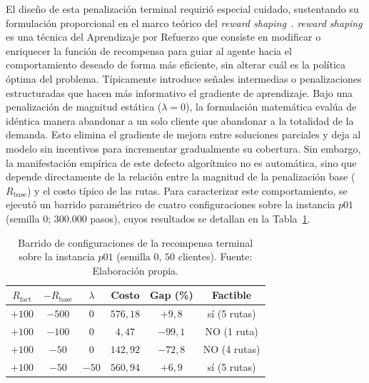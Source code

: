 
El diseño de esta penalización terminal requirió especial cuidado, sustentando su formulación proporcional en el marco teórico del \textit{reward shaping}~\cite{NgHaradaRussell1999}. \textit{reward shaping} es una técnica del Aprendizaje por Refuerzo que consiste en modificar o enriquecer la función de recompensa para guiar al agente hacia el comportamiento deseado de forma más eficiente, sin alterar cuál es la política óptima del problema. Típicamente introduce señales intermedias o penalizaciones estructuradas que hacen más informativo el gradiente de aprendizaje. Bajo una penalización de magnitud estática ($\lambda = 0$), la formulación matemática evalúa de idéntica manera abandonar a un solo cliente que abandonar a la totalidad de la demanda. Esto elimina el gradiente de mejora entre soluciones parciales y deja al modelo sin incentivos para incrementar gradualmente su cobertura. Sin embargo, la manifestación empírica de este defecto algorítmico no es automática, sino que depende directamente de la relación entre la magnitud de la penalización base ($R_{\text{base}}$) y el costo típico de las rutas. Para caracterizar este comportamiento, se ejecutó un barrido paramétrico de cuatro configuraciones sobre la instancia $p01$ (semilla $0$; $300.000$ pasos), cuyos resultados se detallan en la Tabla~\ref{tab:reward-hacking}. 


\begin{table}[H]
    \centering
    \renewcommand{\arraystretch}{1.15}
    \setlength{\tabcolsep}{6pt}
    \begin{tabular}{@{}cccccc@{}}
        \toprule
        $R_{\text{fact}}$ & $-R_{\text{base}}$ & $\lambda$ & \textbf{Costo} & \textbf{Gap (\%)} & \textbf{Factible} \\
        \midrule
        $+100$ & $-500$ & $0$   & $576{,}18$ & $+9{,}8$   & sí (5 rutas) \\
        $+100$ & $-100$ & $0$   & $4{,}47$   & $-99{,}1$  & NO (1 ruta) \\
        $+100$ & $-50$  & $0$   & $142{,}92$ & $-72{,}8$  & NO (4 rutas) \\
        $+100$ & $-50$  & $-50$ & $560{,}94$ & $+6{,}9$   & sí (5 rutas) \\
        \bottomrule
    \end{tabular}
    \caption{\label{tab:reward-hacking} Barrido de configuraciones de la recompensa terminal sobre la instancia $p01$ (semilla 0, $50$ clientes). Fuente: Elaboración propia.}
\end{table}

